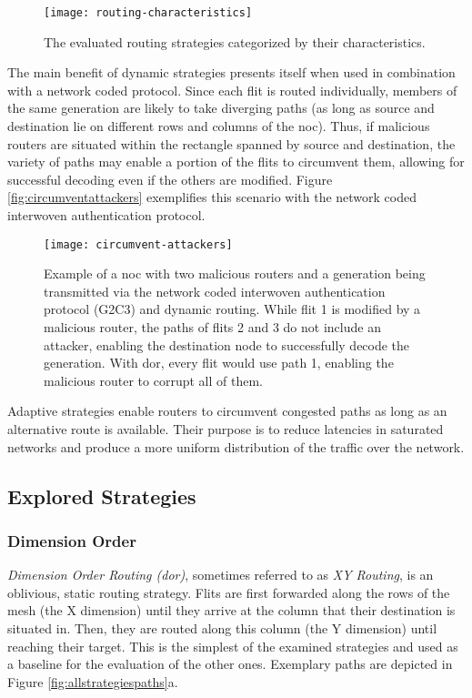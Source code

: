 \begin{figure}
    \centering
    \texttt{[image: routing-characteristics]}
    \caption[Routing strategies by category]{The evaluated routing strategies categorized by their characteristics.}
    \label{fig:routingcharacteristics}
\end{figure}

The main benefit of dynamic strategies presents itself when used in combination with a network coded protocol. Since each flit is routed individually,
members of the same generation are likely to take diverging paths (as long as source and destination lie on different rows and columns of the
\gls{noc}). Thus, if malicious routers are situated within the rectangle spanned by source and destination, the variety of paths may enable a portion
of the flits to circumvent them, allowing for successful decoding even if the others are modified. Figure \vref{fig:circumventattackers} exemplifies
this scenario with the network coded interwoven authentication protocol.%

\begin{figure}
    \centering
    \texttt{[image: circumvent-attackers]}
    \caption[Example of dynamic routing dodging malicious routers]{Example of a \gls{noc} with two malicious routers and a generation being
    transmitted via the network coded interwoven authentication protocol (G2C3) and dynamic routing. While flit 1 is modified by a malicious router,
    the paths of flits 2 and 3 do not include an attacker, enabling the destination node to successfully decode the generation. With \gls{dor}, every
    flit would use path 1, enabling the malicious router to corrupt all of them.}
    \label{fig:circumventattackers}
\end{figure}

Adaptive strategies enable routers to circumvent congested paths as long as an alternative route is available. Their purpose is to reduce latencies in
saturated networks and produce a more uniform distribution of the traffic over the network.

\subsection{Explored Strategies}\label{subsec:routingstrategies}
\subsubsection{Dimension Order}\label{subsubsec:dor}
\textit{Dimension Order Routing (\gls{dor})}, sometimes referred to as \textit{XY Routing}, is an oblivious, static routing strategy. Flits are first
forwarded along the rows of the mesh (the X dimension) until they arrive at the column that their destination is situated in. Then, they are routed
along this column (the Y dimension) until reaching their target. This is the simplest of the examined strategies and used as a baseline for the
evaluation of the other ones. Exemplary paths are depicted in Figure \ref{fig:allstrategiespaths}a.

